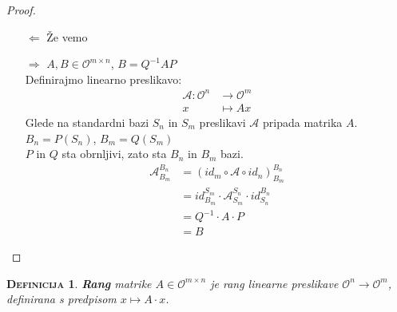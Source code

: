 \documentclass[a4paper,12pt]{article}
\newcommand{\A}{\mathcal{A}}
\newcommand{\OO}{\mathcal{O}}
\newtheorem*{definicija}{\textsc{Definicija}}
\begin{document}
\begin{proof}~
	\begin{itemize}
		\item[$\Leftarrow$] Že vemo
		\item[$\Rightarrow$] $A,B\in \OO^{m\times n}$, $B=Q^{-1}AP$\\
		Definirajmo linearno preslikavo: 
		\begin{align*}
			\A:\OO^n&\to \OO^m \\
			x&\mapsto Ax
		\end{align*} 
		Glede na standardni bazi $S_n$ in $S_m$ preslikavi $\A$ pripada matrika $A$. \\

		$B_n=P(S_n)$, $B_m=Q(S_m)$ \\
		
		$P$ in $Q$ sta obrnljivi, zato sta $B_n$ in $B_m$ bazi. \\
		\begin{align*}
			\A_{B_m}^{B_n}&=(id_m\circ \A \circ id_n)_{B_m}^{B_n}\\
			&= id_{B_m}^{S_m}\cdot \A_{S_m}^{S_n}\cdot id_{S_n}^{B_n}\\
			&= Q^{-1}\cdot A\cdot P\\
			&=B
		\end{align*}
	\end{itemize}
\end{proof}

\begin{definicija}
	\textbf{Rang} matrike $A\in \OO^{m\times n}$ je rang linearne preslikave $\OO^n\to \OO^m$, definirana s predpisom $x\mapsto A\cdot x$. \\
\end{definicija}
\end{document}
